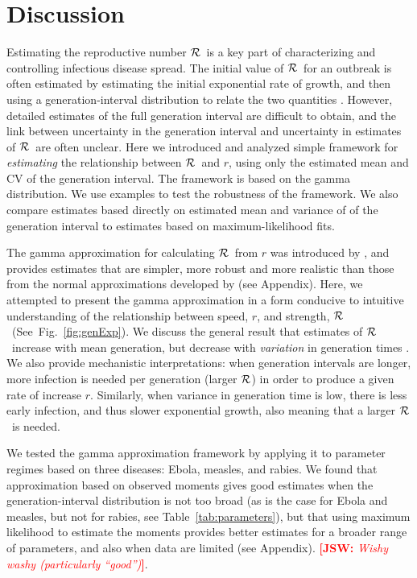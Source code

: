 \documentclass[12pt]{article}
\newcommand{\RR}{\ensuremath{{\cal R}}}
\newcommand{\fref}[1]{Fig.~\ref{fig:#1}}
\newcommand{\tref}[1]{Table~\ref{tab:#1}}
\newcommand{\comment}[3]{\textcolor{#1}{\textbf{[#2: }\textit{#3}\textbf{]}}}
\newcommand{\jsw}[1]{\comment{red}{JSW}{#1}}
\begin{document}
\section{Discussion}

Estimating the reproductive number \RR\ is a key part of characterizing and controlling infectious disease spread. The initial value of \RR\ for an outbreak is often estimated by estimating the initial exponential rate of growth, and then using a generation-interval distribution to relate the two quantities \cite{WallLips07,Sven07,Nish10,Sven15}.
However, detailed estimates of the full generation interval are difficult to obtain, and the link between uncertainty in the generation interval and uncertainty in estimates of \RR\ are often unclear.
Here we introduced and analyzed simple framework for \emph{estimating} the relationship between \RR\ and $r$, using only the estimated mean and CV of the generation interval. The framework is based on the gamma distribution. We use examples to test the robustness of the framework. We also compare estimates based directly on estimated mean and variance of of the generation interval to estimates based on maximum-likelihood fits.

The gamma approximation for calculating \RR\ from $r$ was introduced by \cite{NishCast09}, and  provides estimates that are simpler, more robust and more realistic than those from the normal approximations developed by \cite{WallLips07} (see Appendix).
Here, we attempted to present the gamma approximation in a form conducive to intuitive understanding of the relationship between speed, $r$, and strength, \RR\ (See~\fref{genExp}).
We discuss the general result that estimates of \RR\ increase with mean generation, but decrease with \emph{variation} in generation times \cite{WallLips07}. 
We also provide mechanistic interpretations: when generation intervals are longer, more infection is needed per generation (larger \RR)  in order to produce a given rate of increase $r$. Similarly, when variance in generation time is low, there is less early infection, and thus slower exponential growth, also meaning that a larger \RR\ is needed. 

We tested the gamma approximation framework by applying it to parameter regimes based on three diseases: Ebola, measles, and rabies. 
We found that approximation based on observed moments gives good estimates when the generation-interval distribution is not too broad (as is the case for Ebola and measles, but not for rabies, see \tref{parameters}), but that using maximum likelihood to estimate the moments provides better estimates for a broader range of parameters, and also when data are limited (see Appendix). \jsw{Wishy washy (particularly ``good'')}.
\end{document}
